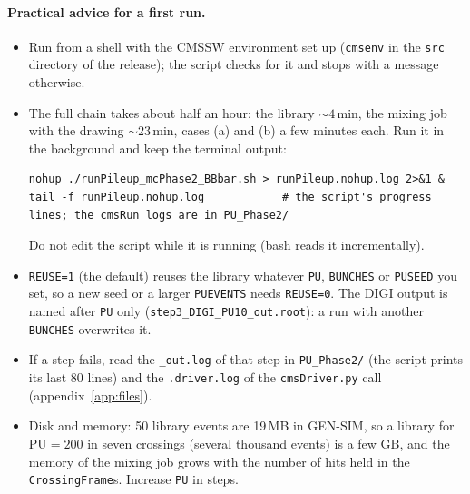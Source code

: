 \documentclass[11pt,a4paper]{article}
\newcommand{\code}[1]{\texttt{#1}}
\begin{document}
\paragraph{Practical advice for a first run.}
\begin{itemize}
\item Run from a shell with the CMSSW environment set up (\code{cmsenv} in the \code{src} directory of
  the release); the script checks for it and stops with a message otherwise.
\item The full chain takes about half an hour: the library $\sim4$\,min, the mixing job with the drawing
  $\sim23$\,min, cases (a) and (b) a few minutes each. Run it in the background and keep the terminal output:
\begin{lstlisting}[style=sh]
nohup ./runPileup_mcPhase2_BBbar.sh > runPileup.nohup.log 2>&1 &
tail -f runPileup.nohup.log            # the script's progress lines; the cmsRun logs are in PU_Phase2/
\end{lstlisting}
  Do not edit the script while it is running (bash reads it incrementally).
\item \code{REUSE=1} (the default) reuses the library whatever \code{PU}, \code{BUNCHES} or \code{PUSEED} you
  set, so a new seed or a larger \code{PUEVENTS} needs \code{REUSE=0}. The DIGI output is named after
  \code{PU} only (\code{step3\_DIGI\_PU10\_out.root}): a run with another \code{BUNCHES} overwrites it.
\item If a step fails, read the \code{\_out.log} of that step in \code{PU\_Phase2/} (the script prints its
  last 80 lines) and the \code{.driver.log} of the \code{cmsDriver.py} call (appendix~\ref{app:files}).
\item Disk and memory: 50 library events are 19\,MB in GEN-SIM, so a library for $\mathrm{PU}=200$ in seven
  crossings (several thousand events) is a few GB, and the memory of the mixing job grows with the number of
  hits held in the \code{CrossingFrame}s. Increase \code{PU} in steps.
\end{itemize}
\end{document}

